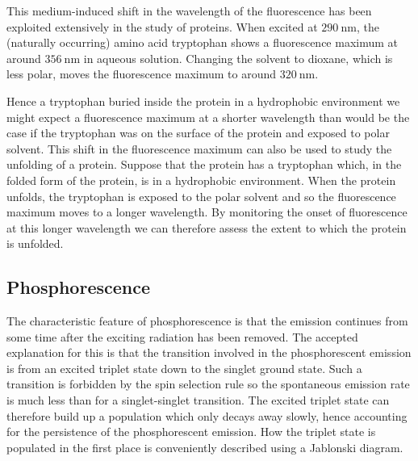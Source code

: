 \documentclass{article}
\theoremstyle{plain}\theoremheaderfont{\normalfont\itshape}\theorembodyfont{\rmfamily}\theoremseparator{.}\newtheorem*{rem}{Remark}\newtheorem*{ex}{Example}\newtheorem*{proof}{Proof}\newtheorem*{altp}{Alternative proof}
\theoremstyle{plain}\theoremheaderfont{\normalfont\bfseries}\theorembodyfont{\rmfamily}\theoremseparator{.}\newtheorem{thm}{Theorem}[section]\newtheorem{lem}[thm]{Lemma}\newtheorem{prop}[thm]{Proposition}\newtheorem*{cor}{Corollary}\newtheorem{defn}[thm]{Definition}\newtheorem{clm}[thm]{Claim}\newtheorem{clminproof}{Claim}\newtheorem{pos}{Postulate}[section]
\theoremstyle{break}\theoremheaderfont{\normalfont\itshape}\theorembodyfont{\rmfamily}\theoremseparator{.\medskip}\newtheorem*{proofskip}{Proof}\newtheorem*{exs}{Examples}\newtheorem*{rems}{Remarks}
\theoremstyle{break}\theoremheaderfont{\normalfont\bfseries}\theorembodyfont{\rmfamily}\theoremseparator{.\medskip}\newtheorem{lemskip}[thm]{Lemma}\newtheorem{defnskip}[thm]{Definition}\newtheorem{propskip}[thm]{Proposition}\newtheorem{thmskip}[thm]{Theorem}
\numberwithin{equation}{section}
\newcommand{\unit}[1]{\ \mathrm{#1}}
\begin{document}
    This medium-induced shift in the wavelength of the fluorescence has been exploited extensively in the study of proteins. When excited at \(290\unit{nm}\), the (naturally occurring) amino acid tryptophan shows a fluorescence maximum at around \(356\unit{nm}\) in aqueous solution. Changing the solvent to dioxane, which is less polar, moves the fluorescence maximum to around \(320\unit{nm}\).

    Hence a tryptophan buried inside the protein in a hydrophobic environment we might expect a fluorescence maximum at a shorter wavelength than would be the case if the tryptophan was on the surface of the protein and exposed to polar solvent. This shift in the fluorescence maximum can also be used to study the unfolding of a protein. Suppose that the protein has a tryptophan which, in the folded form of the protein, is in a hydrophobic environment. When the protein unfolds, the tryptophan is exposed to the polar solvent and so the fluorescence maximum moves to a longer wavelength. By monitoring the onset of fluorescence at this longer wavelength we can therefore assess the extent to which the protein is unfolded.

    \subsection{Phosphorescence}
    The characteristic feature of phosphorescence is that the emission continues from some time after the exciting radiation has been removed. The accepted explanation for this is that the transition involved in the phosphorescent emission is from an excited triplet state down to the singlet ground state. Such a transition is forbidden by the spin selection rule so the spontaneous emission rate is much less than for a singlet-singlet transition. The excited triplet state can therefore build up a population which only decays away slowly, hence accounting for the persistence of the phosphorescent emission. How the triplet state is populated in the first place is conveniently described using a Jablonski diagram.
\end{document}
